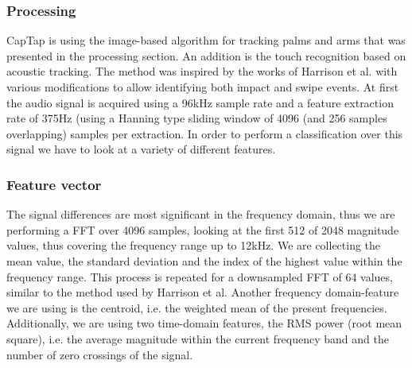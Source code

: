 \subsubsection{Processing}
CapTap is using the image-based algorithm for tracking palms and arms that was presented in the processing section. An addition is the touch recognition based on acoustic tracking. The method was inspired by the works of Harrison et al. \cite{harrison2011tapsense} with various modifications to allow identifying both impact and swipe events. At first the audio signal is acquired using a 96kHz sample rate and a feature extraction rate of 375Hz (using a  Hanning type sliding window of 4096 (and 256 samples overlapping) samples per extraction. In order to perform a classification over this signal we have to look at a variety of different features.
\subsubsection*{Feature vector}
The signal differences are most significant in the frequency domain, thus we are performing a FFT over 4096 samples, looking at the first 512 of 2048 magnitude values, thus covering the frequency range up to 12kHz. We are collecting the mean value, the standard deviation and the index of the highest value within the frequency range. This process is repeated for a downsampled FFT of 64 values, similar to the method used by Harrison et al. Another frequency domain-feature we are using is the centroid, i.e. the weighted mean of the present frequencies. Additionally, we are using two time-domain features, the RMS power (root mean square), i.e. the average magnitude within the current frequency band and the number of zero crossings of the signal. 
